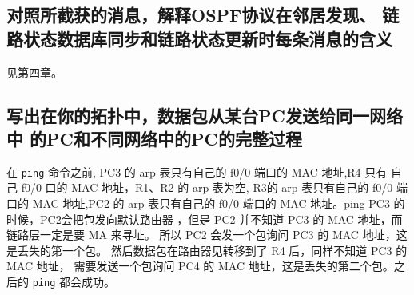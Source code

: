 \documentclass[black,normal,cn]{elegantnote}
\begin{document}
\subsection{对照所截获的消息，解释OSPF协议在邻居发现、
链路状态数据库同步和链路状态更新时每条消息的含义}
见第四章。

\subsection{写出在你的拓扑中，数据包从某台PC发送给同一网络中
的PC和不同网络中的PC的完整过程}
在 \texttt{ping} 命令之前, PC3 的 arp 表只有自己的 f0/0 端口的 MAC 地址,R4 只有
自己 f0/0 口的 MAC 地址，R1、R2 的 arp 表为空, R3的 arp 表只有自己的 f0/0 端口的
MAC 地址,PC2 的 arp 表只有自己的 f0/0 端口的 MAC 地址。ping PC3 的时候，PC2会把包发向默认路由器
，但是 PC2 并不知道 PC3 的 MAC 地址，而链路层一定是要 MA 来寻址。
所以 PC2 会发一个包询问 PC3 的 MAC 地址，这是丢失的第一个包。
然后数据包在路由器见转移到了 R4 后，同样不知道 PC3 的 MAC 地址，
需要发送一个包询问 PC4 的 MAC 
地址，这是丢失的第二个包。之后的 \texttt{ping} 都会成功。
\end{document}
